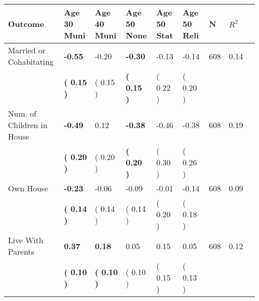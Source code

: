 \begin{tabular}{L{6.2cm} C{1.8cm} C{1.8cm} C{1.8cm} C{1.8cm} C{1.8cm} C{1.8cm} C{0.3cm} C{0.3cm}}
\toprule
 \textbf{Outcome} & \textbf{Age 30 Muni} & \textbf{Age 40 Muni} & \textbf{Age 50 None} & \textbf{Age 50 Stat} & \textbf{Age 50 Reli} & \textbf{N} & \textbf{$ R^2$} \\
\midrule
Married or Cohabitating & \textbf{    -0.55} &     -0.20 & \textbf{    -0.30} &     -0.13 &     -0.14  & 608 &       0.14 \\ 
 & \textbf{(     0.15 )} & (     0.15 ) & \textbf{(     0.15 )} & (     0.22 ) & (     0.20 )  & \\
Num. of Children in House & \textbf{    -0.49} &      0.12 & \textbf{    -0.38} &     -0.46 &     -0.38  & 608 &       0.19 \\ 
 & \textbf{(     0.20 )} & (     0.20 ) & \textbf{(     0.20 )} & (     0.30 ) & (     0.26 )  & \\
Own House & \textbf{    -0.23} &     -0.06 &     -0.09 &     -0.01 &     -0.14  & 608 &       0.09 \\ 
 & \textbf{(     0.14 )} & (     0.14 ) & (     0.14 ) & (     0.20 ) & (     0.18 )  & \\
Live With Parents & \textbf{     0.37} & \textbf{     0.18} &      0.05 &      0.15 &      0.05  & 608 &       0.12 \\ 
 & \textbf{(     0.10 )} & \textbf{(     0.10 )} & (     0.10 ) & (     0.15 ) & (     0.13 )  & \\
\bottomrule
\end{tabular}
